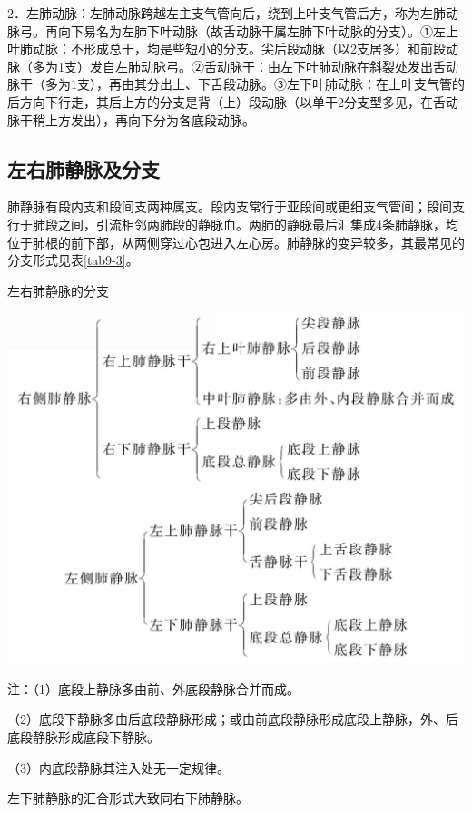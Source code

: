 2．左肺动脉：左肺动脉跨越左主支气管向后，绕到上叶支气管后方，称为左肺动脉弓。再向下易名为左肺下叶动脉（故舌动脉干属左肺下叶动脉的分支）。①左上叶肺动脉：不形成总干，均是些短小的分支。尖后段动脉（以2支居多）和前段动脉（多为1支）发自左肺动脉弓。②舌动脉干：由左下叶肺动脉在斜裂处发出舌动脉干（多为1支），再由其分出上、下舌段动脉。③左下叶肺动脉：在上叶支气管的后方向下行走，其后上方的分支是背（上）段动脉（以单干2分支型多见，在舌动脉干稍上方发出），再向下分为各底段动脉。

\subsection{左右肺静脉及分支}

肺静脉有段内支和段间支两种属支。段内支常行于亚段间或更细支气管间；段间支行于肺段之间，引流相邻两肺段的静脉血。两肺的静脉最后汇集成4条肺静脉，均位于肺根的前下部，从两侧穿过心包进入左心房。肺静脉的变异较多，其最常见的分支形式见表\ref{tab9-3}。

\begin{table}[htbp]
{\centering
\caption{左右肺静脉的分支}
\label{tab9-3}
\includegraphics[width=\textwidth,height=\textheight,keepaspectratio]{./images/Image00184.jpg}}

{\small
注：（1）底段上静脉多由前、外底段静脉合并而成。

（2）底段下静脉多由后底段静脉形成；或由前底段静脉形成底段上静脉，外、后底段静脉形成底段下静脉。

（3）内底段静脉其注入处无一定规律。

左下肺静脉的汇合形式大致同右下肺静脉。
}

\end{table}



